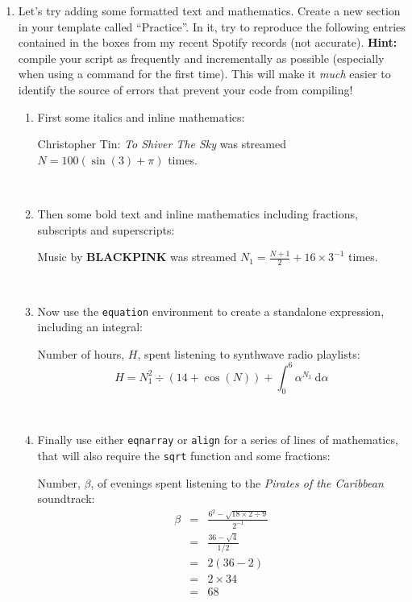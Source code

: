 \documentclass[12pt,fleqn]{article}
\begin{document}
\begin{enumerate}
	\item Let's try adding some formatted text and mathematics. Create a new section in your template called ``Practice''. In it, try to reproduce the following entries contained in the boxes from my recent Spotify records (not accurate). \textbf{Hint:} compile your script as frequently and incrementally as possible (especially when using a command for the first time). This will make it \emph{much} easier to identify the source of errors that prevent your code from compiling!\\
	\begin{enumerate}
		\item First some italics and inline mathematics:\\
			\begin{tcolorbox}
			Christopher Tin: \emph{To Shiver The Sky} was streamed $N = 100(\sin(3) + \pi)$ times.
			\end{tcolorbox}
			~\\
		\item Then some bold text and inline mathematics including fractions, subscripts and superscripts:\\
			\begin{tcolorbox}
			Music by \textbf{BLACKPINK} was streamed $N_{1} = \frac{N+1}{2} + 16 \times 3^{-1}$ times.
			\end{tcolorbox}
			~\\
		\item Now use the \verb!equation! environment to create a standalone expression, including an integral:\\
			\begin{tcolorbox}	
			Number of hours, $H$, spent listening to synthwave radio playlists:
			\begin{equation*}
			 	H = N_{1}^{2} \div (14 + \cos(N)) + \int_{0}^{6} \alpha^{N_{1}} \ \mathrm{d}\alpha
			 \end{equation*}
			 \end{tcolorbox}
			 ~\\
			\newpage
		\item Finally use either \verb!eqnarray! or \verb!align! for a series of lines of mathematics, that will also require the \verb!sqrt! function and some fractions:\\
		\begin{tcolorbox}	
			Number, $\beta$, of evenings spent listening to the \emph{Pirates of the Caribbean} soundtrack:
			\begin{eqnarray}
				\beta &=& \frac{6^{2} - \sqrt{18 \times 2 \div 9}}{2^{-1}} \\
						&=& \frac{36 - \sqrt{4}}{1/2} \\
						&=& 2( 36 - 2 ) \\
						&=& 2 \times 34 \\
						&=& 68
			\end{eqnarray}
		\end{tcolorbox}
		

\end{enumerate}
\end{enumerate}
\end{document}

